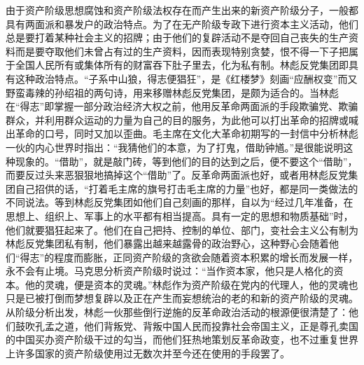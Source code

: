 \begin{maonote}
由于资产阶级思想腐蚀和资产阶级法权存在而产生出来的新资产阶级分子，一般都具有两面派和暴发户的政治特点。为了在无产阶级专政下进行资本主义活动，他们总是要打着某种社会主义的招牌；由于他们的复辟活动不是夺回自己丧失的生产资料而是要夺取他们未曾占有过的生产资料，因而表现特别贪婪，恨不得一下子把属于全国人民所有或集体所有的财富吞下肚子里去，化为私有制。林彪反党集团即具有这种政治特点。“子系中山狼，得志便猖狂”，是《红楼梦》刻画“应酬权变”而又野蛮毒辣的孙绍祖的两句诗，用来移赠林彪反党集团，是颇为适合的。当林彪在“得志”即掌握一部分政治经济大权之前，他用反革命两面派的手段欺骗党、欺骗群众，并利用群众运动的力量为自己的目的服务，为此他可以打出革命的招牌或喊出革命的口号，同时又加以歪曲。毛主席在文化大革命初期写的一封信中分析林彪一伙的内心世界时指出：“我猜他们的本意，为了打鬼，借助钟馗。”是很能说明这种现象的。“借助”，就是敲门砖，等到他们的目的达到之后，便不要这个“借助”，而要反过头来恶狠狠地搞掉这个“借助”了。反革命两面派也好，或者用林彪反党集团自己招供的话，“打着毛主席的旗号打击毛主席的力量”也好，都是同一类做法的不同说法。等到林彪反党集团如他们自己刻画的那样，自以为“经过几年准备，在思想上、组织上、军事上的水平都有相当提高。具有一定的思想和物质基础”时，他们就要猖狂起来了。他们在自己把持、控制的单位、部门，变社会主义公有制为林彪反党集团私有制，他们暴露出越来越露骨的政治野心，这种野心会随着他们“得志”的程度而膨胀，正同资产阶级的贪欲会随着资本积累的增长而发展一样，永不会有止境。马克思分析资产阶级时说过：“当作资本家，他只是人格化的资本。他的灵魂，便是资本的灵魂。”林彪作为资产阶级在党内的代理人，他的灵魂也只是已被打倒而梦想复辟以及正在产生而妄想统治的老的和新的资产阶级的灵魂。从阶级分析出发，林彪一伙那些倒行逆施的反革命政治活动的根源便很清楚了：他们鼓吹孔孟之道，他们背叛党、背叛中国人民而投靠社会帝国主义，正是尊孔卖国的中国买办资产阶级干过的勾当，而他们狂热地策划反革命政变，也不过重复世界上许多国家的资产阶级使用过无数次并至今还在使用的手段罢了。


\end{maonote}
